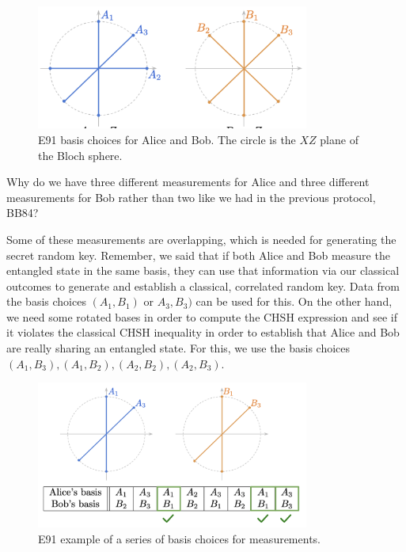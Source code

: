 \begin{figure}[H]
    \centering
    \includegraphics[width=0.8\textwidth]{lesson10/e91-bases.png}
        \caption{E91 basis choices for Alice and Bob.  The circle is the $XZ$ plane of the Bloch sphere.}
    \label{fig:e91-bases}
\end{figure}

Why do we have three different measurements for Alice and three different measurements for Bob rather than two like we had in the previous protocol, BB84?

Some of these measurements are overlapping, which is needed for generating the secret random key. Remember, we said that if both Alice and Bob measure the entangled state in the same basis, they can use that information via our classical outcomes to generate and establish a classical, correlated random key. Data from the basis choices $(A_1, B_1)$ or $A_3,B_3)$ can be used for this. On the other hand, we need some rotated bases in order to compute the CHSH expression and see if it violates the classical CHSH inequality in order to establish that Alice and Bob are really sharing an entangled state. For this, we use the basis choices $(A_1,B_3), (A_1,B_2), (A_2,B_2), (A_2,B_3)$.

\begin{figure}[H]
    \centering
    \includegraphics[width=0.8\textwidth]{lesson10/e91-example.png}
        \caption{E91 example of a series of basis choices for measurements.}
    \label{fig:e91-example}
\end{figure}


